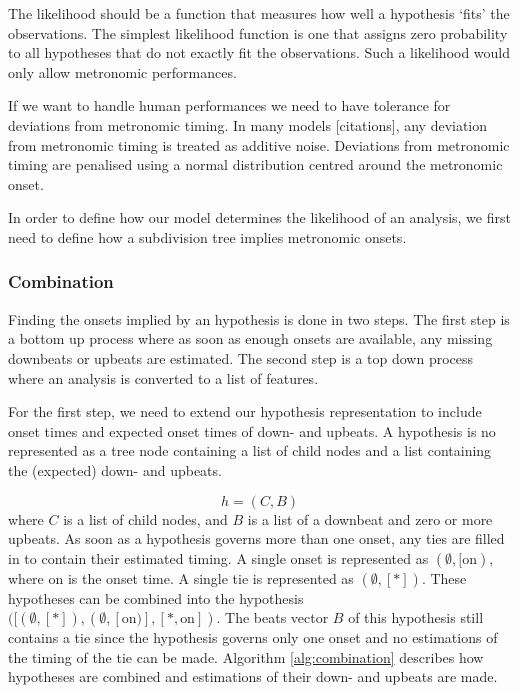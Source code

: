 The likelihood should be a function that measures how well a hypothesis `fits' the observations. The simplest likelihood function is one that assigns zero probability to all hypotheses that do not exactly fit the observations. Such a likelihood would only allow metronomic performances. 

If we want to handle human performances we need to have tolerance for deviations from metronomic timing. In many models [citations], any deviation from metronomic timing is treated as additive noise. Deviations from metronomic timing are penalised using a normal distribution centred around the metronomic onset.

In order to define how our model determines the likelihood of an analysis, we first need to define how a subdivision tree implies metronomic onsets. 


\subsubsection{Combination}

Finding the onsets implied by an hypothesis is done in two steps. The first step is a bottom up process where as soon as enough onsets are available, any missing downbeats or upbeats are estimated. The second step is a top down process where an analysis is converted to a list of features.

For the first step, we need to extend our hypothesis representation to include onset times and expected onset times of down- and upbeats. A hypothesis is no represented as a tree node containing a list of child nodes and a list containing the (expected) down- and upbeats. 

\begin{equation}
h = (C, B)
\end{equation}
where $C$ is a list of child nodes, and $B$ is a list of a downbeat and zero or more upbeats. As soon as a hypothesis governs more than one onset, any ties are filled in to contain their estimated timing. A single onset is represented as $(\emptyset, [\textrm{on})$, where on is the onset time. A single tie is represented as $(\emptyset, [*])$. These hypotheses can be combined into the hypothesis $([(\emptyset, [*]), (\emptyset, [\textrm{on})], [*, \textrm{on}])$. The beats vector $B$ of this hypothesis still contains a tie since the hypothesis governs only one onset and no estimations of the timing of the tie can be made. Algorithm \ref{alg:combination} describes how hypotheses are combined and estimations of their down- and upbeats are made.

